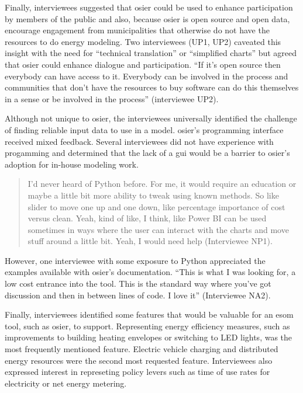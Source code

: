 Finally, interviewees suggested that \ac{osier} could be used to enhance
participation by members of the public and also, because \ac{osier} is open
source and open data, encourage engagement from municipalities that otherwise do
not have the resources to do energy modeling. Two interviewees (UP1, UP2)
caveated this insight with the need for ``technical translation'' or
``simplified charts'' but agreed that \ac{osier} could enhance dialogue and
participation. ``If it's open source then everybody can have access to it.
Everybody can be involved in the process and communities that don't have the
resources to buy software can do this themselves in a sense or be involved in
the process'' (interviewee UP2). 

Although not unique to \ac{osier}, the interviewees universally identified the
challenge of finding reliable input data to use in a model. \ac{osier}'s
programming interface received mixed feedback. Several interviewees did not have
experience with progamming and determined that the lack of a \ac{gui} would be a
barrier to \ac{osier}'s adoption for in-house modeling work. 
\begin{quote}
    I'd never heard of Python before. For me, it would require an education or
    maybe a little bit more ability to tweak using known methods. So like slider
    to move one up and one down, like percentage importance of cost versus
    clean. Yeah, kind of like, I think, like Power BI can be used sometimes in
    ways where the user can interact with the charts and move stuff around a
    little bit. Yeah, I would need help (Interviewee NP1).
\end{quote}
However, one interviewee with some exposure to Python appreciated the examples
available with \ac{osier}'s documentation. ``This is what I was looking for, a
low cost entrance into the tool. This is the standard way where you've got
discussion and then in between lines of code. I love it'' (Interviewee NA2).

Finally, interviewees identified some features that would be valuable for an
\ac{esom} tool, such as \ac{osier}, to support. Representing energy efficiency
measures, such as improvements to building heating envelopes or switching to LED
lights, was the most frequently mentioned feature. Electric vehicle charging and
distributed energy resources were the second most requested feature.
Interviewees also expressed interest in represeting policy levers such as time
of use rates for electricity or net energy metering.